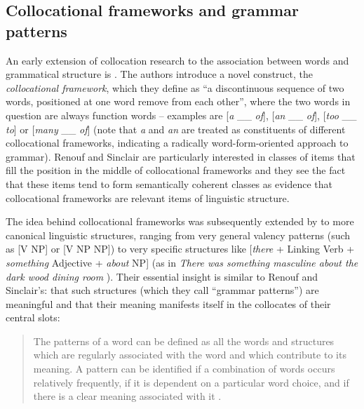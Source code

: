 \subsection{Collocational frameworks and grammar patterns}
\label{sec:collocationalframeworksandgrammarpatterns}

An early extension of collocation  research to the association  between words and grammatical  structure is \citet{renouf_collocational_1991}. The authors introduce a novel construct, the \textit{collocational framework},  which they define as ``a discontinuous sequence of two words, positioned at one word remove from each other'', where the two words in question are always function words -- examples are [\textit{a} \_\_ \textit{of}], [\textit{an} \_\_ \textit{of}], [\textit{too} \_\_ \textit{to}] or [\textit{many} \_\_ \textit{of}] (note that \textit{a} and \textit{an} are treated as constituents of different collocational  frameworks, indicating a radically word\hyp{}form\hyp{}oriented approach to grammar).  Renouf and Sinclair are particularly interested in classes of items that fill the position in the middle of collocational frameworks and they see the fact that these items tend to form semantically  coherent classes as evidence that collocational  frameworks  are relevant items of linguistic structure.

The idea behind collocational frameworks  was subsequently extended by \citet{hunston_pattern_2000} to more canonical linguistic structures, ranging from very general valency  patterns (such as [V NP] or [V NP NP]) to very specific structures like [\textit{there} + Linking Verb  + \textit{something} Adjective + \textit{about} NP] (as in \textit{There was something masculine about the dark wood dining room} \citep[51, 53, 106]{hunston_pattern_2000}). Their essential insight is similar to Renouf and Sinclair's: that such structures (which they call ``grammar  patterns'')  are meaningful and that their meaning manifests itself in the collocates  of their central slots:

\begin{quotation}
The patterns of a word can be defined as all the words and structures which are regularly associated  with the word and which contribute to its meaning.  A pattern can be identified if a combination of words occurs relatively frequently, if it is dependent on a particular word choice, and if there is a clear meaning associated with it \citep[37]{hunston_pattern_2000}.
\end{quotation}

